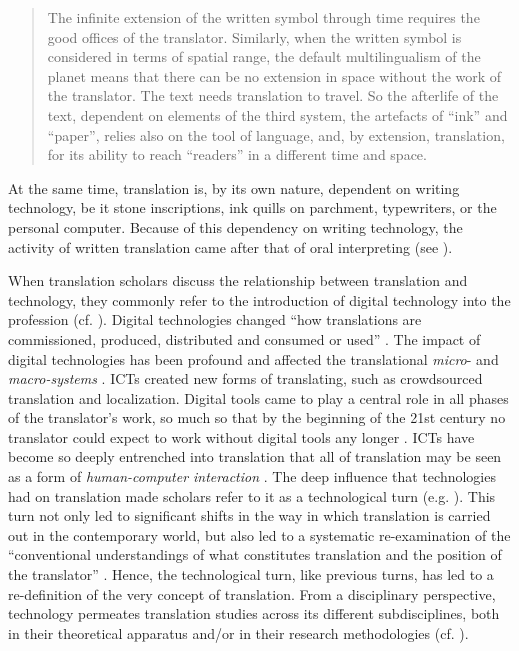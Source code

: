 \begin{quote}
    The infinite extension of the written symbol through time requires the good offices of the translator. Similarly, when the written symbol is considered in terms of spatial range, the default multilingualism of the planet means that there can be no extension in space without the work of the translator. The text needs translation to travel. So the afterlife of the text, dependent on elements of the third system, the artefacts of “ink” and “paper”, relies also on the tool of language, and, by extension, translation, for its ability to reach “readers” in a different time and space. \citep[22]{cronin2012translation}
\end{quote}
At the same time, translation is, by its own nature, dependent on writing technology, be it stone inscriptions, ink quills on parchment, typewriters, or the personal computer. Because of this dependency on writing technology, the activity of written translation came after that of oral interpreting (see   ).

\begin{sloppypar}
When translation scholars discuss the relationship between translation and technology, they commonly refer to the introduction of digital technology into the profession (cf. \cite{chan2015}). Digital technologies changed ``how translations are commissioned, produced, distributed and consumed or used'' \citep[2]{jimenez2020technological}. The impact of digital technologies has been profound and affected the translational \textit{micro}- and \textit{macro-systems} \citep{o2013impact}. ICTs created new forms of translating, such as crowdsourced translation and localization. Digital tools came to play a central role in all phases of the translator’s work, so much so that by the beginning of the 21st century no translator could expect to work without digital tools any longer \citep{bowker2002computer}. ICTs have become so deeply entrenched into translation that all of translation may be seen as a form of \textit{human-computer interaction} \citep{o2012translation}. The deep influence that technologies had on translation made scholars refer to it as a technological turn (e.g. \cite{chan2007taking,cronin2010translation,o2013impact}). This turn not only led to significant shifts in the way in which translation is carried out in the contemporary world, but also led to a systematic re-examination of the ``conventional understandings of what constitutes translation and the position of the translator'' \citep[1]{cronin2010translation}. Hence, the technological turn, like previous turns, has led to a re-definition of the very concept of translation. From a disciplinary perspective, technology permeates translation studies across its different subdisciplines, both in their theoretical apparatus and/or in their research methodologies (cf. \cite{jimenez2020technological}).
\end{sloppypar}

